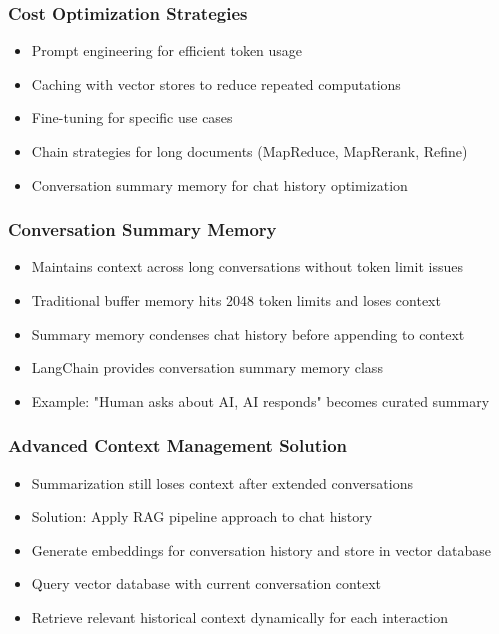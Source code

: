 \begin{frame}[fragile]\frametitle{Cost Optimization Strategies}
      \begin{itemize}
	\item Prompt engineering for efficient token usage
	\item Caching with vector stores to reduce repeated computations
	\item Fine-tuning for specific use cases
	\item Chain strategies for long documents (MapReduce, MapRerank, Refine)
	\item Conversation summary memory for chat history optimization
	  \end{itemize}
\end{frame}

\begin{frame}[fragile]\frametitle{Conversation Summary Memory}
      \begin{itemize}
	\item Maintains context across long conversations without token limit issues
	\item Traditional buffer memory hits 2048 token limits and loses context
	\item Summary memory condenses chat history before appending to context
	\item LangChain provides conversation summary memory class
	\item Example: "Human asks about AI, AI responds" becomes curated summary
	  \end{itemize}
\end{frame}

\begin{frame}[fragile]\frametitle{Advanced Context Management Solution}
      \begin{itemize}
	\item Summarization still loses context after extended conversations
	\item Solution: Apply RAG pipeline approach to chat history
	\item Generate embeddings for conversation history and store in vector database
	\item Query vector database with current conversation context
	\item Retrieve relevant historical context dynamically for each interaction
	  \end{itemize}
\end{frame}

